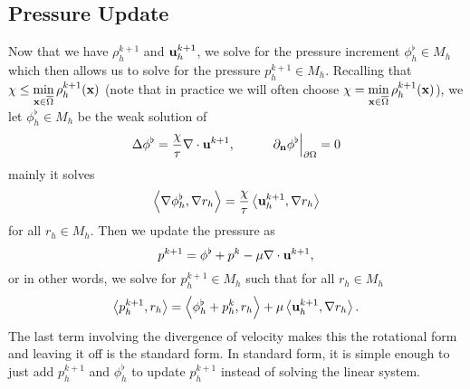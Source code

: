 \documentclass[letterpaper]{erdc}
\begin{document}
%
\subsection{Pressure Update}
Now that we have $\rho_h^{k+1}$ and $\textbf{u}_h^{k+1}$, we solve for the pressure increment $\phi_h^{\flat}\in M_h$ which then allows us to solve for the pressure $p_h^{k+1}\in M_h$.  
Recalling that $\chi \leq \displaystyle\min_{\textbf{x}\in\overline{\Omega}} \rho_h^{k+1}(\textbf{x})$ (note that in practice we will often choose $\chi = \displaystyle\min_{\textbf{x}\in\overline{\Omega}} \rho_h^{k+1}(\textbf{x})$), we let $\phi_h^{\flat}\in M_h$ be the weak solution of
\begin{equation}\label{eqn:pressureincrementlaplacian}
  \Delta \phi^{\flat} = \frac{\chi}{\tau}\nabla\cdot \textbf{u}^{k+1}, \hspace{1cm} \left.\partial_{\textbf{n}}\phi^{\flat}\right|_{\partial\Omega} = 0
\end{equation}
mainly it solves
\begin{equation}
  \left\langle \nabla\phi_h^{\flat}, \nabla r_h \right\rangle = \frac{\chi}{\tau}\left\langle \textbf{u}_h^{k+1}, \nabla r_h \right\rangle
\end{equation}
for all $r_h \in M_h$.  Then we update the pressure as
\begin{equation}\label{eqn:rotationalpressureupdate}
  p^{k+1} = \phi^{\flat} + p^{k} - \mu\nabla\cdot \textbf{u}^{k+1},
\end{equation}
or in other words, we solve for $p_h^{k+1}\in M_h$ such that for all $r_h\in M_h$
\begin{equation}
  \left\langle p_h^{k+1}, r_h \right\rangle = \left\langle \phi_h^{\flat} + p_h^{k}, r_h \right\rangle + \mu\left\langle \textbf{u}_h^{k+1}, \nabla r_h \right\rangle.
\end{equation}
The last term involving the divergence of velocity makes this the rotational form and leaving it off is the standard form.  In standard form, it is simple enough to just add $p_h^{k+1}$ and $\phi_h^{\flat}$ to update $p_h^{k+1}$ instead of solving the linear system.
\end{document}
